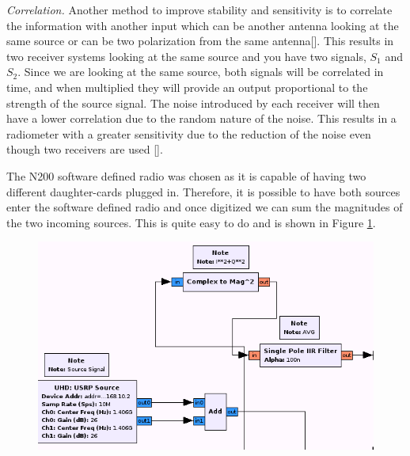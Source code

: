 
 
\emph{Correlation.}  Another method to improve stability and sensitivity is to correlate the information with another input which can be another antenna looking at the same source or can be two polarization from the same antenna[\cite{Clapp}].  This results in two receiver systems looking at the same source and you have two signals, $S_1$ and $S_2$.  Since we are looking at the same source, both signals will be correlated in time, and when multiplied they will provide an output proportional to the strength of the source signal.  The noise introduced by each receiver will then have a lower correlation due to the random nature of the noise.  This results in a radiometer with a greater sensitivity due to the reduction of the noise even though two receivers are used [\cite{Fujimoto}].

The N200 software defined radio was chosen as it is capable of having two different daughter-cards plugged in.  Therefore, it is possible to have both sources enter the software defined radio and once digitized we can sum the magnitudes of the two incoming sources.  This is quite easy to do and is shown in Figure \ref{correlating_sdr}.

{\begin{figure}[h!tb] 
\centering
\includegraphics[width=14cm]{Images/N200_rad_corr.png}
\label{correlating_sdr}
\end{figure}
}

